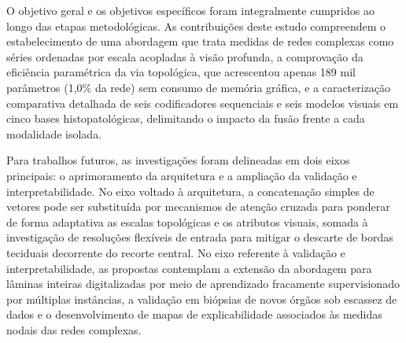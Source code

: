 O objetivo geral e os objetivos específicos foram integralmente cumpridos ao longo das etapas metodológicas. As contribuições deste estudo compreendem o estabelecimento de uma abordagem que trata medidas de redes complexas como séries ordenadas por escala acopladas à visão profunda, a comprovação da eficiência paramétrica da via topológica, que acrescentou apenas 189 mil parâmetros (1,0\% da rede) sem consumo de memória gráfica, e a caracterização comparativa detalhada de seis codificadores sequenciais e seis modelos visuais em cinco bases histopatológicas, delimitando o impacto da fusão frente a cada modalidade isolada.

Para trabalhos futuros, as investigações foram delineadas em dois eixos principais: o aprimoramento da arquitetura e a ampliação da validação e interpretabilidade. No eixo voltado à arquitetura, a concatenação simples de vetores pode ser substituída por mecanismos de atenção cruzada para ponderar de forma adaptativa as escalas topológicas e os atributos visuais, somada à investigação de resoluções flexíveis de entrada para mitigar o descarte de bordas teciduais decorrente do recorte central. No eixo referente à validação e interpretabilidade, as propostas contemplam a extensão da abordagem para lâminas inteiras digitalizadas por meio de aprendizado fracamente supervisionado por múltiplas instâncias, a validação em biópsias de novos órgãos sob escassez de dados e o desenvolvimento de mapas de explicabilidade associados às medidas nodais das redes complexas.
